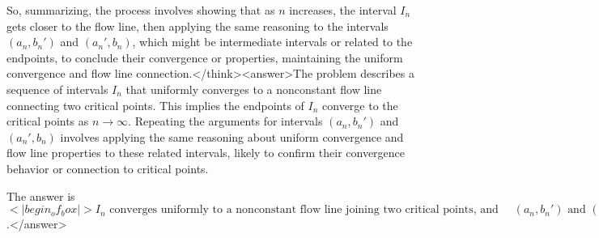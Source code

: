 So, summarizing, the process involves showing that as \( n \) increases, the interval \( I_n \) gets closer to the flow line, then applying the same reasoning to the intervals \( (a_n, b_n') \) and \( (a_n', b_n) \), which might be intermediate intervals or related to the endpoints, to conclude their convergence or properties, maintaining the uniform convergence and flow line connection.</think><answer>The problem describes a sequence of intervals \( I_n \) that uniformly converges to a nonconstant flow line connecting two critical points. This implies the endpoints of \( I_n \) converge to the critical points as \( n \to \infty \). Repeating the arguments for intervals \( (a_n, b_n') \) and \( (a_n', b_n) \) involves applying the same reasoning about uniform convergence and flow line properties to these related intervals, likely to confirm their convergence behavior or connection to critical points.  

The answer is \(<|begin_of_box|>I_n \text{ converges uniformly to a nonconstant flow line joining two critical points, and the arguments repeat similarly for } (a_n, b_n') \text{ and } (a_n', b_n)<|end_of_box|>\).</answer>